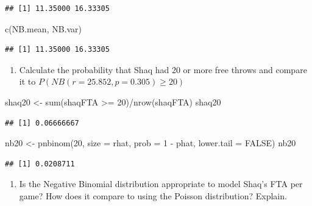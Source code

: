 \documentclass[
  11pt,
]{book}
\newenvironment{Shaded}{\begin{snugshade}}{\end{snugshade}}
\newcommand{\AttributeTok}[1]{\textcolor[rgb]{0.77,0.63,0.00}{#1}}
\newcommand{\ConstantTok}[1]{\textcolor[rgb]{0.00,0.00,0.00}{#1}}
\newcommand{\DecValTok}[1]{\textcolor[rgb]{0.00,0.00,0.81}{#1}}
\newcommand{\FunctionTok}[1]{\textcolor[rgb]{0.00,0.00,0.00}{#1}}
\newcommand{\NormalTok}[1]{#1}
\newcommand{\OtherTok}[1]{\textcolor[rgb]{0.56,0.35,0.01}{#1}}
\newcommand{\SpecialCharTok}[1]{\textcolor[rgb]{0.00,0.00,0.00}{#1}}
\providecommand{\tightlist}{%
  \setlength{\itemsep}{0pt}\setlength{\parskip}{0pt}}
\theoremstyle{definition}
\theoremstyle{definition}
\theoremstyle{definition}
\theoremstyle{definition}
\theoremstyle{remark}
\begin{document}
\begin{verbatim}
## [1] 11.35000 16.33305
\end{verbatim}

\begin{Shaded}
\begin{Highlighting}[]
\FunctionTok{c}\NormalTok{(NB.mean, NB.var)}
\end{Highlighting}
\end{Shaded}

\begin{verbatim}
## [1] 11.35000 16.33305
\end{verbatim}

\begin{enumerate}
\def\labelenumi{(\alph{enumi})}
\setcounter{enumi}{3}
\tightlist
\item
  Calculate the probability that Shaq had 20 or more free throws and compare it to \(P(NB(r=25.852,p=0.305) \geq 20)\)
\end{enumerate}

\begin{Shaded}
\begin{Highlighting}[]
\NormalTok{shaq20 }\OtherTok{\textless{}{-}} \FunctionTok{sum}\NormalTok{(shaqFTA }\SpecialCharTok{\textgreater{}=} \DecValTok{20}\NormalTok{)}\SpecialCharTok{/}\FunctionTok{nrow}\NormalTok{(shaqFTA)}
\NormalTok{shaq20}
\end{Highlighting}
\end{Shaded}

\begin{verbatim}
## [1] 0.06666667
\end{verbatim}

\begin{Shaded}
\begin{Highlighting}[]
\NormalTok{nb20 }\OtherTok{\textless{}{-}} \FunctionTok{pnbinom}\NormalTok{(}\DecValTok{20}\NormalTok{, }\AttributeTok{size =}\NormalTok{ rhat, }\AttributeTok{prob =} \DecValTok{1} \SpecialCharTok{{-}}\NormalTok{ phat, }\AttributeTok{lower.tail =} \ConstantTok{FALSE}\NormalTok{)}
\NormalTok{nb20}
\end{Highlighting}
\end{Shaded}

\begin{verbatim}
## [1] 0.0208711
\end{verbatim}

\begin{enumerate}
\def\labelenumi{(\alph{enumi})}
\setcounter{enumi}{4}
\tightlist
\item
  Is the Negative Binomial distribution appropriate to model Shaq's FTA per game? How does it compare to using the Poisson distribution? Explain.\\
  \strut \\
  \strut \\
  \strut \\
\end{enumerate}
\end{document}

